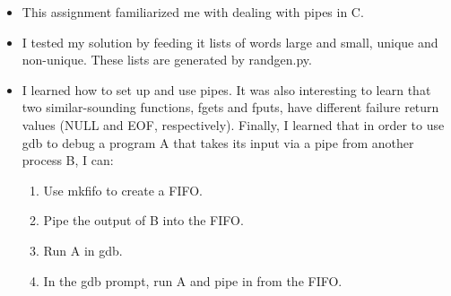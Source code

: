 \documentclass[12pt,letterpaper]{article}
\begin{document}
\begin{itemize}
	\item This assignment familiarized me with dealing with pipes in C.
	\item I tested my solution by feeding it lists of words large and small, unique and non-unique. These lists are generated by randgen.py.
	\item I learned how to set up and use pipes. It was also interesting to learn that two similar-sounding functions, fgets and fputs, have different failure return values (NULL and EOF, respectively). Finally, I learned that in order to use gdb to debug a program A that takes its input via a pipe from another process B, I can:

		\begin{enumerate}
			\item Use mkfifo to create a FIFO.
			\item Pipe the output of B into the FIFO.
			\item Run A in gdb.
			\item In the gdb prompt, run A and pipe in from the FIFO.
		\end{enumerate}
\end{itemize}
\end{document}
